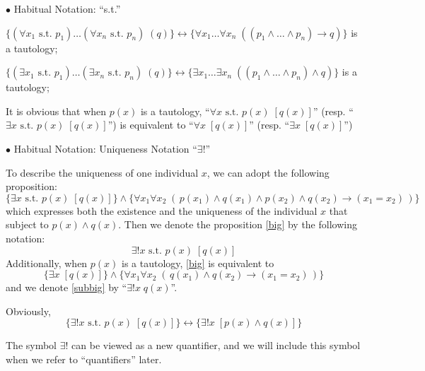 \documentclass{article}
\begin{document}
\begin{Spec}{$\bullet$ Habitual Notation: ``s.t.''}
\begin{compactitem}
{\begin{compactenum}
            \item $\{(\forall x_1 \text{ s.t. } p_1) \dots (\forall x_n \text{ s.t. } p_n)\; (q)\}\leftrightarrow \{\forall x_1 \dots \forall x_n \;((p_1\land \dots \land p_n) \rightarrow q)\}$ is a tautology;
            \item $\{(\exists x_1 \text{ s.t. } p_1) \dots (\exists x_n \text{ s.t. } p_n)\; (q)\}\leftrightarrow \{\exists x_1 \dots \exists x_n \;((p_1\land \dots \land p_n) \land q)\}$ is a tautology; 
        \end{compactenum}}
        \item \textcolor{Tr}{It is obvious that when $p(x)$ is a tautology, ``$\forall x \text{ s.t. } p(x)\; [q(x)]$'' (resp. ``$\exists x \text{ s.t. } p(x)\; [q(x)]$'') is equivalent to ``$\forall x\; [q(x)]$'' (resp. ``$\exists x\; [q(x)]$'')}
    \end{compactitem}
\end{Spec}

\begin{Spec}{$\bullet$ Habitual Notation: Uniqueness Notation ``$\exists !$''}
    \begin{compactitem}
        
        \item \textcolor{Df}{To describe the uniqueness of one individual $x$, we can adopt the following proposition: 
        \begin{equation}
            \{\exists x \text{ s.t. } p(x)\; [q(x)]\} \land \{\forall x_1 \forall x_2 \;(\,p(x_1)\land q(x_1)\land p(x_2)\land q(x_2)\rightarrow (x_1=x_2)\,)\} \label{big} 
        \end{equation}
        which expresses both the existence and the uniqueness of the individual $x$ that subject to $p(x)\land q(x)$. Then we denote the proposition \eqref{big} by the following notation:
        $$\exists! x \text{ s.t. } p(x)\; [q(x)]$$
        Additionally, when $p(x)$ is a tautology, \eqref{big} is equivalent to
        \begin{equation}
            \{\exists x\; [q(x)]\} \land \{\forall x_1 \forall x_2 \;(\,q(x_1)\land q(x_2)\rightarrow (x_1=x_2)\,)\} \label{subbig} 
        \end{equation}
        and we denote \eqref{subbig} by ``$\exists! x\;q(x)$''.}

        \item \textcolor{Tr}{Obviously, $$\{\exists! x \text{ s.t. } p(x)\; [q(x)]\} \leftrightarrow \{\exists! x\; [p(x)\land q(x)]\}$$}
        \item The symbol $\exists!$ can be viewed as a new quantifier, and we will include this symbol when we refer to ``quantifiers'' later.
    \end{compactitem}
\end{Spec}
\end{document}
